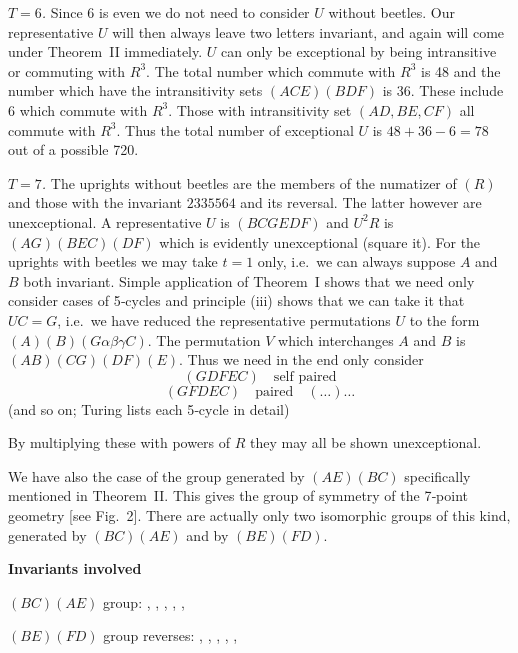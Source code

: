 \documentclass[12pt]{article}
\begin{document}
\medskip

\noindent
{\em $T = 6$.}
Since 6 is even we do not need to consider $U$ without beetles. Our representative $U$ will then always leave two letters invariant, and again will come under Theorem~II immediately. $U$ can only be exceptional by being intransitive or commuting with $R^3$. The total number which commute with $R^3$ is 48 and the number which have the intransitivity sets $(ACE)(BDF)$ is 36. These include 6 which commute with $R^3$. Those with intransitivity set $(AD, BE, CF)$ all commute with $R^3$. Thus the total number of exceptional $U$ is $48 + 36 - 6 = 78$ out of a possible 720.

\medskip

\noindent
{\em $T = 7$.}
The uprights without beetles are the members of the numatizer of $(R)$ and those with the invariant $2335564$ and its reversal. The latter however are unexceptional. A representative $U$ is $(BCGEDF)$ and $U^2 R$ is $(AG)(BEC)(DF)$ which is evidently unexceptional (square it). For the uprights with beetles we may take $t = 1$ only, i.e.\ we can always suppose $A$ and $B$ both invariant. Simple application of Theorem~I shows that we need only consider cases of 5‐cycles and principle (iii) shows that we can take it that $UC = G$, i.e.\ we have reduced the representative permutations $U$ to the form $(A)(B)(G\alpha\beta\gamma C)$. The permutation $V$ which interchanges $A$ and $B$ is $(AB)(CG)(DF)(E)$. Thus we need in the end only consider
\[
(GDFEC) \quad\text{self paired}
\]
\[
(GFDEC) \quad\text{paired}
\quad
(\ldots)\dots
\]
(and so on; Turing lists each 5‐cycle in detail)

By multiplying these with powers of $R$ they may all be shown unexceptional.

\medskip

We have also the case of the group generated by $(AE)(BC)$ specifically mentioned in Theorem~II. This gives the group of symmetry of the 7‐point geometry [see Fig.~2]. There are actually only two isomorphic groups of this kind, generated by $(BC)(AE)$ and by $(BE)(FD)$.

\medskip

\noindent
{\bf Invariants involved}

\noindent
$(BC)(AE)$ group: , , , , , 

\noindent
$(BE)(FD)$ group reverses: , , , , , 
\end{document}
